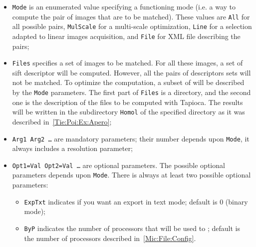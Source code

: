 \begin{itemize}

    \item {\tt Mode} is an enumerated value specifying a functioning mode
          (i.e. a way to compute the pair of images that are to be matched).
          These values are {\tt All} for all possible pairs, {\tt MulScale}
          for a multi-scale optimization, {\tt Line} for a selection adapted 
          to linear images acquisition, and {\tt File} for  XML file
          describing the pairs;

    \item {\tt Files} specifies a set of images to be matched. For all these
         images, a set of sift descriptor will be computed. However, all the pairs of
         descriptors sets will not be  matched. To optimize the computation, a subset
         of  will be described by the {\tt Mode} parameters.
         The first part of {\tt Files} is a directory, and the second one is the description
         of the files to be computed with Tapioca.
         The results will be written in the subdirectory {\tt Homol} of the
         specified directory as it was described in~\ref{Tie:Poi:Ex:Apero};



    \item  {\tt Arg1 Arg2  \dots} are mandatory parameters; their number depends
           upon {\tt Mode}, it always includes a resolution parameter;

    \item  {\tt  Opt1=Val Opt2=Val  \dots} are optional parameters. The possible
           optional parameters depends upon {\tt Mode}.
           There is always at least two possible optional parameters:

            \begin{itemize}
                 \item {\tt ExpTxt} indicates if you want an export in text mode;
                       default is $0$ (binary mode);

                 \item {\tt ByP} indicates the number of processors that will be used
                        to ; %
                       default is the number of
                        processors described in~\ref{Mic:File:Config}.
            \end{itemize}

\end{itemize}

